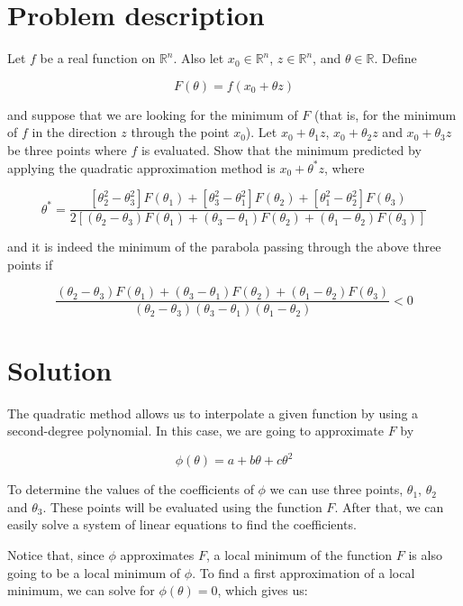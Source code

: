 \documentclass[11pt,a4paper]{article}
\begin{document}
\setlength{\parskip}{1em}


\section{Problem description}

Let $f$ be a real function on $\mathbb{R}^n$. Also let $x_0 \in \mathbb{R}^n$,
$z \in \mathbb{R}^n$, and $\theta \in \mathbb{R}$. Define

\[
  F(\theta) = f(x_0 + \theta z)
\]

\noindent and suppose that we are looking for the minimum of $F$ (that is, for the
minimum of $f$ in the direction $z$ through the point $x_0$). Let $x_0 + \theta_1z$, 
$x_0 + \theta_2z$ and $x_0 + \theta_3z$ be three points where $f$ is evaluated.
Show that the minimum predicted by applying the quadratic approximation method is
$x_0 + \theta^* z$, where

\[
  \theta^* = \frac{[\theta_2^2 - \theta_3^2]F(\theta_1) + [\theta_3^2 - \theta_1^2]F(\theta_2) + [\theta_1^2 - \theta_2^2]F(\theta_3)}{2[(\theta_2 - \theta_3)F(\theta_1) + (\theta_3 - \theta_1)F(\theta_2) + (\theta_1 - \theta_2)F(\theta_3)]}
\]

\noindent and it is indeed the minimum of the parabola passing through the above three
points if

\[
  \frac{
    (\theta_2 - \theta_3)F(\theta_1) + (\theta_3 - \theta_1)F(\theta_2) + (\theta_1 - \theta_2)F(\theta_3)
  }{
    (\theta_2 - \theta_3)(\theta_3 - \theta_1)(\theta_1 - \theta_2)
  } < 0
\]

\section{Solution}

The quadratic method allows us to interpolate a given function by using a second-degree polynomial.
In this case, we are going to approximate $F$ by

\[
  \phi(\theta) = a + b\theta + c\theta^2
\]

To determine the values of the coefficients of $\phi$ we can use three points, $\theta_1$, $\theta_2$ and
$\theta_3$. These points will be evaluated using the function $F$. After that, we can easily solve a system
of linear equations to find the coefficients.

Notice that, since $\phi$ approximates $F$, a local minimum of the function $F$ is also going to be a local
minimum of $\phi$. To find a first approximation of a local minimum, we can solve for $\phi(\theta) = 0$,
which gives us:
\end{document}
